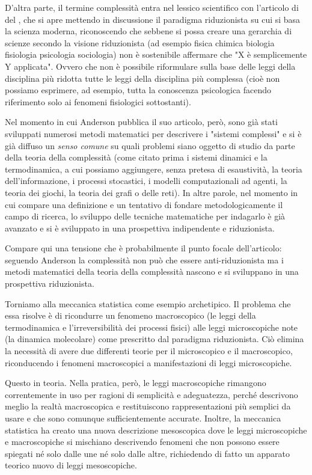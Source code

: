 \documentclass[a4paper, headings=standardclasses]{scrartcl}
\begin{document}
D'altra parte, il termine complessità entra nel lessico scientifico con l'articolo di \citeauthor{anderson1972} del \citeyear{anderson1972} , che si apre mettendo in discussione il paradigma riduzionista su cui si basa la scienza moderna, riconoscendo che sebbene si possa creare una gerarchia di scienze secondo la visione riduzionista (ad esempio fisica \textrightarrow{} chimica \textrightarrow{} biologia \textrightarrow{} fisiologia \textrightarrow{} psicologia \textrightarrow{} sociologia) non è sostenibile affermare che "X è semplicemente Y applicata".
Ovvero che non è possibile riformulare sulla base delle leggi della disciplina più ridotta tutte le leggi della disciplina più complessa (cioè non possiamo esprimere, ad esempio, tutta la conoscenza psicologica facendo riferimento solo ai fenomeni fisiologici sottostanti).

Nel momento in cui Anderson pubblica il suo articolo, però, sono già stati sviluppati numerosi metodi matematici per descrivere i "sistemi complessi" e si è già diffuso un \textit{senso comune} su quali problemi siano oggetto di studio da parte della teoria della complessità (come citato prima i sistemi dinamici e la termodinamica, a cui possiamo aggiungere, senza pretesa di esaustività, la teoria dell'informazione, i processi stocastici, i modelli computazionali ad agenti, la teoria dei giochi, la teoria dei grafi o delle reti).
In altre parole, nel momento in cui compare una definizione e un tentativo di fondare metodologicamente il campo di ricerca, lo sviluppo delle tecniche matematiche per indagarlo è già avanzato e si è sviluppato in una prospettiva indipendente e riduzionista.

Compare qui una tensione che è probabilmente il punto focale dell'articolo: seguendo Anderson la complessità non può che essere anti-riduzionista ma i metodi matematici della teoria della complessità nascono e si sviluppano in una prospettiva riduzionista.

Torniamo alla meccanica statistica come esempio archetipico. Il problema che essa risolve è di ricondurre un fenomeno macroscopico (le leggi della termodinamica e l'irreversibilità dei processi fisici) alle leggi microscopiche note (la dinamica molecolare) come prescritto dal paradigma riduzionista.  Ciò elimina la necessità di avere due differenti teorie per il microscopico e il macroscopico, riconducendo i fenomeni macroscopici a manifestazioni di leggi microscopiche.

Questo in teoria. Nella pratica, però, le leggi macroscopiche rimangono correntemente in uso per ragioni di semplicità e adeguatezza, perché descrivono meglio la realtà macroscopica e restituiscono rappresentazioni più semplici da usare e che sono comunque sufficientemente accurate.
Inoltre, la meccanica statistica ha creato una nuova descrizione mesoscopica dove le leggi microscopiche e macroscopiche si mischiano descrivendo fenomeni che non possono essere spiegati né solo dalle une né solo dalle altre, richiedendo di fatto un apparato teorico nuovo di leggi mesoscopiche.
\end{document}

